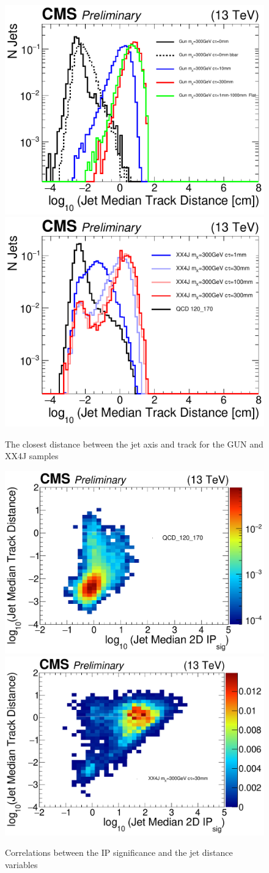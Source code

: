 \begin{figure}
\begin{center}
\includegraphics[width=.45\textwidth]{figures/an_jetid/VTX_MATCH_IP/GUN_log_jetMedianTrackDist}
\includegraphics[width=.45\textwidth]{figures/an_jetid/VTX_MATCH_IP/XX4J_log_jetMedianTrackDist}
\end{center}
\caption{The closest distance between the jet axis and track for the GUN and XX4J samples}
\label{fig:jetDist}
\end{figure}

\begin{figure}
\begin{center}
\includegraphics[width=.45\textwidth]{figures/an_jetid/VTX_MATCH_IP/QCD_2D_ipsig_jetDist}
\includegraphics[width=.45\textwidth]{figures/an_jetid/VTX_MATCH_IP/XX4J_2D_ipsig_jetDist}
\end{center}
\caption{Correlations between the IP significance and the jet distance variables}
\label{fig:jetDist_ipsig}
\end{figure}

